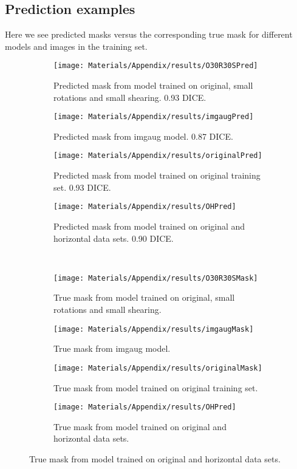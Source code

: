 \subsection{Prediction examples}
Here we see predicted masks versus the corresponding true mask for different models and images in the training set.

\begin{figure}[H]
	\centering
	\begin{subfigure}[b]{0.23\linewidth}
		\centering
		\texttt{[image: Materials/Appendix/results/O30R30SPred]}
		\caption{Predicted mask from model trained on original, small rotations and small shearing. 0.93 DICE.}
	\end{subfigure}
	\hfill
	\begin{subfigure}[b]{0.23\linewidth}
		\centering
		\texttt{[image: Materials/Appendix/results/imgaugPred]}
		\caption{Predicted mask from imgaug model. 0.87 DICE.\newline\newline}
	\end{subfigure}
	\hfill
	\begin{subfigure}[b]{0.23\linewidth}
		\centering
		\texttt{[image: Materials/Appendix/results/originalPred]}
		\caption{Predicted mask from model trained on original training set. 0.93 DICE.\newline}
	\end{subfigure}
	\hfill
	\begin{subfigure}[b]{0.23\linewidth}
		\centering
		\texttt{[image: Materials/Appendix/results/OHPred]}
		\caption{Predicted mask from model trained on original and horizontal data sets. 0.90 DICE.}
	\end{subfigure}
	\\
	\begin{subfigure}[b]{0.23\linewidth}
		\centering
		\texttt{[image: Materials/Appendix/results/O30R30SMask]}
		\caption{True mask from model trained on original, small rotations and small shearing.}
	\end{subfigure}
	\hfill
	\begin{subfigure}[b]{0.23\linewidth}
		\centering
		\texttt{[image: Materials/Appendix/results/imgaugMask]}
		\caption{True mask from imgaug model.\newline\newline}
	\end{subfigure}	
	\hfill
	\begin{subfigure}[b]{0.23\linewidth}
		\centering
		\texttt{[image: Materials/Appendix/results/originalMask]}
		\caption{True mask from model trained on original training set.\newline}
	\end{subfigure}
	\hfill
	\begin{subfigure}[b]{0.23\linewidth}
		\centering
		\texttt{[image: Materials/Appendix/results/OHPred]}
		\caption{True mask from model trained on original and horizontal data sets.\newline}
	\end{subfigure}
\end{figure}